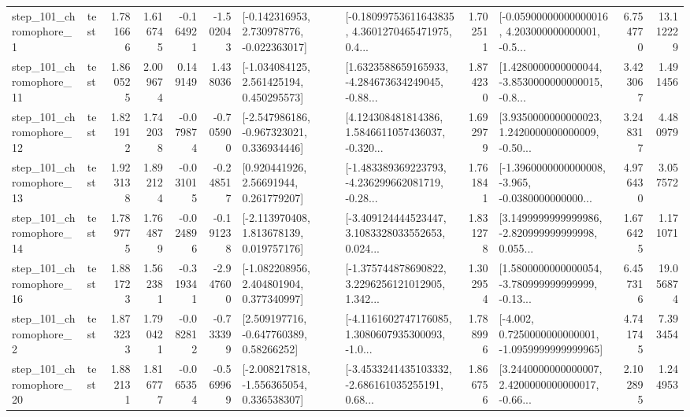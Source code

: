 \begin{tabular}{llrrrrllrlrr}
   step\_101\_chromophore\_1 &      test &      1.781666 &    1.616745 &     -0.164921 & -1.502043 &   [-0.142316953, 2.730978776, -0.022363017] &  [-0.18099753611643835, 4.3601270465471975, 0.4... &       1.702511 &  [-0.05900000000000016, 4.203000000000001, -0.5... &            6.754770 &         13.112229 \\
  step\_101\_chromophore\_11 &      test &      1.860525 &    2.009674 &      0.149149 &  1.438036 &    [-1.034084125, 2.561425194, 0.450295573] &  [1.6323588659165933, -4.284673634249045, -0.88... &       1.874230 &  [1.4280000000000044, -3.8530000000000015, -0.8... &            3.423067 &          1.491456 \\
  step\_101\_chromophore\_12 &      test &      1.821912 &    1.742038 &     -0.079874 & -0.705900 &   [-2.547986186, -0.967323021, 0.336934446] &  [4.124308481814386, 1.5846611057436037, -0.320... &       1.692979 &  [3.9350000000000023, 1.2420000000000009, -0.50... &            3.248317 &          4.480979 \\
  step\_101\_chromophore\_13 &      test &      1.923138 &    1.892124 &     -0.031015 & -0.248517 &      [0.920441926, 2.56691944, 0.261779207] &  [-1.483389369223793, -4.236299662081719, -0.28... &       1.761841 &  [-1.3960000000000008, -3.965, -0.0380000000000... &            4.976430 &          3.057572 \\
  step\_101\_chromophore\_14 &      test &      1.789775 &    1.764879 &     -0.024896 & -0.191238 &    [-2.113970408, 1.813678139, 0.019757176] &  [-3.409124444523447, 3.1083328033552653, 0.024... &       1.831278 &  [3.1499999999999986, -2.820999999999998, 0.055... &            1.676425 &          1.171071 \\
  step\_101\_chromophore\_16 &      test &      1.881723 &    1.562381 &     -0.319341 & -2.947600 &    [-1.082208956, 2.404801904, 0.377340997] &  [-1.375744878690822, 3.2296256121012905, 1.342... &       1.302954 &  [1.5800000000000054, -3.780999999999999, -0.13... &            6.457316 &         19.056874 \\
   step\_101\_chromophore\_2 &      test &      1.873233 &    1.790421 &     -0.082812 & -0.733399 &     [2.509197716, -0.647760389, 0.58266252] &  [-4.1161602747176085, 1.3080607935300093, -1.0... &       1.788996 &  [-4.002, 0.7250000000000001, -1.0959999999999965] &            4.741745 &          7.393454 \\
  step\_101\_chromophore\_20 &      test &      1.882131 &    1.816777 &     -0.065354 & -0.569969 &   [-2.008217818, -1.556365054, 0.336538307] &  [-3.4533241435103332, -2.686161035255191, 0.68... &       1.866756 &  [3.2440000000000007, 2.4200000000000017, -0.66... &            2.102895 &          1.244953 \\

\end{tabular}
